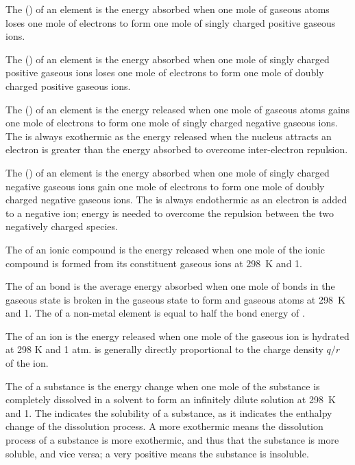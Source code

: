 \documentclass[Chemistry.tex]{subfiles}
\begin{document}
The  () of an element is the energy absorbed when one mole of gaseous atoms loses one mole of electrons to form one mole of singly charged positive gaseous ions.

The  () of an element is the energy absorbed when one mole of singly charged positive gaseous ions loses one mole of electrons to form one mole of doubly charged positive gaseous ions.

The  () of an element is the energy released when one mole of gaseous atoms gains one mole of electrons to form one mole of singly charged negative gaseous ions. The  is always exothermic as the energy released when the nucleus attracts an electron is greater than the energy absorbed to overcome inter-electron repulsion.

The  () of an element is the energy absorbed when one mole of singly charged negative gaseous ions gain one mole of electrons to form one mole of doubly charged negative gaseous ions. The  is always endothermic as an electron is added to a negative ion; energy is needed to overcome the repulsion between the two negatively charged species.

The   of an ionic compound is the energy released when one mole of the ionic compound is formed from its constituent gaseous ions at \SI{298}{\kelvin} and \SI{1}{\atmosphere}.

The  \slBE{} of an  bond is the average energy absorbed when one mole of  bonds in the gaseous state is broken in the gaseous state to form  and  gaseous atoms at \SI{298}{\kelvin} and \SI{1}{\atmosphere}. The  of a non-metal element  is equal to half the bond energy of .

The   of an ion is the energy released when one mole of the gaseous ion is hydrated at 298 K and 1 atm.  is generally directly proportional to the charge density \(q/r\) of the ion.

The   of a substance is the energy change when one mole of the substance is completely dissolved in a solvent to form an infinitely dilute solution at \SI{298}{\kelvin} and \SI{1}{\atmosphere}. The  indicates the solubility of a substance, as it indicates the enthalpy change of the dissolution process. A more exothermic  means the dissolution process of a substance is more exothermic, and thus that the substance is more soluble, and vice versa; a very positive  means the substance is insoluble.
\end{document}
